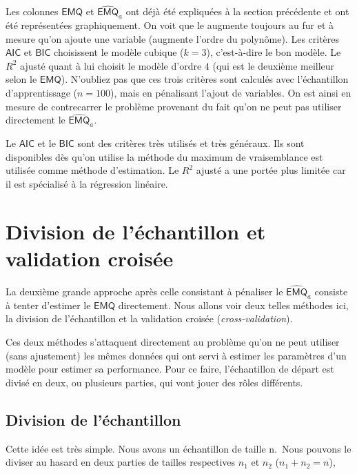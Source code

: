 \documentclass[
  11pt,
  letterpaper,
]{book}
\theoremstyle{definition}
\theoremstyle{definition}
\theoremstyle{definition}
\theoremstyle{remark}
\begin{document}
Les colonnes \(\mathsf{EMQ}\) et \(\widehat{\mathsf{EMQ}}_a\) ont déjà été expliquées à la section précédente et ont été représentées graphiquement.
On voit que le augmente toujours au fur et à mesure qu'on ajoute une variable (augmente l'ordre du polynôme). Les critères \(\mathsf{AIC}\) et \(\mathsf{BIC}\) choisissent le modèle cubique (\(k=3\)), c'est-à-dire le bon modèle. Le \(R^2\) ajusté quant à lui choisit le modèle d'ordre \(4\) (qui est le deuxième meilleur selon le \(\mathsf{EMQ}\)). N'oubliez pas que ces trois critères sont calculés avec l'échantillon d'apprentissage (\(n=100\)), mais en pénalisant l'ajout de variables. On est ainsi en mesure de contrecarrer le problème provenant du fait qu'on ne peut pas utiliser directement le \(\widehat{\mathsf{EMQ}}_a\).

Le \(\mathsf{AIC}\) et le \(\mathsf{BIC}\) sont des critères très utilisés et très généraux. Ils sont disponibles dès qu'on utilise la méthode du maximum de vraisemblance est utilisée comme méthode d'estimation. Le \(R^2\) ajusté a une portée plus limitée car il est spécialisé à la régression linéaire.

\hypertarget{division-de-luxe9chantillon-et-validation-croisuxe9e}{%
\section{Division de l'échantillon et validation croisée}\label{division-de-luxe9chantillon-et-validation-croisuxe9e}}

La deuxième grande approche après celle consistant à pénaliser le \(\widehat{\mathsf{EMQ}}_a\) consiste à tenter d'estimer le \(\mathsf{EMQ}\) directement. Nous allons voir deux telles méthodes ici, la division de l'échantillon et la validation croisée (\emph{cross-validation}).

Ces deux méthodes s'attaquent directement au problème qu'on ne peut utiliser (sans ajustement) les mêmes données qui ont servi à estimer les paramètres d'un modèle pour estimer sa performance. Pour ce faire, l'échantillon de départ est divisé en deux, ou plusieurs parties, qui vont jouer des rôles différents.

\hypertarget{division-de-luxe9chantillon}{%
\subsection{Division de l'échantillon}\label{division-de-luxe9chantillon}}

Cette idée est très simple. Nous avons un échantillon de taille n.~Nous pouvons le diviser au hasard en deux parties de tailles respectives \(n_1\) et \(n_2\) (\(n_1+n_2=n\)),
\end{document}
